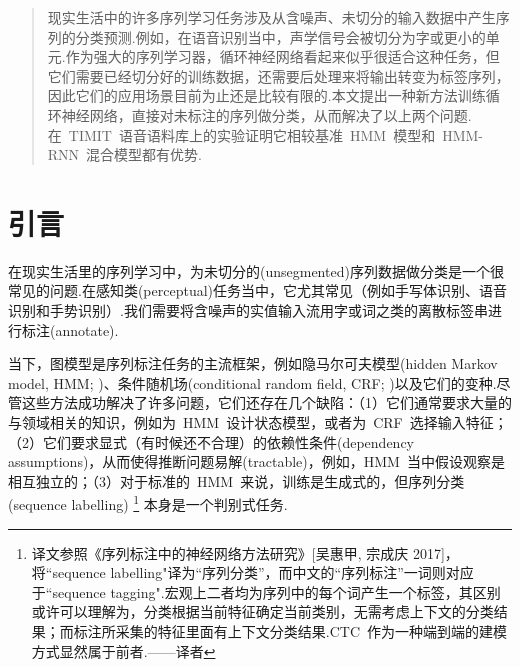 \documentclass{ctexart}
\begin{document}
 


\printAffiliationsAndNotice{}

\begin{abstract} 
现实生活中的许多序列学习任务涉及从含噪声、未切分的输入数据中产生序列的分类预测.例如，在语音识别当中，声学信号会被切分为字或更小的单元.作为强大的序列学习器，循环神经网络看起来似乎很适合这种任务，但它们需要已经切分好的训练数据，还需要后处理来将输出转变为标签序列，因此它们的应用场景目前为止还是比较有限的.本文提出一种新方法训练循环神经网络，直接对未标注的序列做分类，从而解决了以上两个问题.在~TIMIT~语音语料库上的实验证明它相较基准~HMM~模型和~HMM-RNN~混合模型都有优势.
\end{abstract} 

\section{引言}
\label{sec:intro}
在现实生活里的序列学习中，为未切分的(unsegmented)序列数据做分类是一个很常见的问题.在感知类(perceptual)任务当中，它尤其常见（例如手写体识别、语音识别和手势识别）.我们需要将含噪声的实值输入流用字或词之类的离散标签串进行标注(annotate).

当下，图模型是序列标注任务的主流框架，例如隐马尔可夫模型(hidden Markov model, HMM; \citealp{rabiner1989tutorial})、条件随机场(conditional random field, CRF; \citealp{lafferty2001conditional})以及它们的变种.尽管这些方法成功解决了许多问题，它们还存在几个缺陷：（1）它们通常要求大量的与领域相关的知识，例如为~HMM~设计状态模型，或者为~CRF~选择输入特征；（2）它们要求显式（有时候还不合理）的依赖性条件(dependency assumptions)，从而使得推断问题易解(tractable)，例如，HMM~当中假设观察是相互独立的；（3）对于标准的~HMM~来说，训练是生成式的，但序列分类(sequence labelling)
\footnote{译文参照《序列标注中的神经网络方法研究》[吴惠甲, 宗成庆 2017]，将``sequence labelling"译为“序列分类”，而中文的“序列标注”一词则对应于``sequence tagging".宏观上二者均为序列中的每个词产生一个标签，其区别或许可以理解为，分类根据当前特征确定当前类别，无需考虑上下文的分类结果；而标注所采集的特征里面有上下文分类结果.CTC~作为一种端到端的建模方式显然属于前者.——译者}
本身是一个判别式任务.
\end{document}
